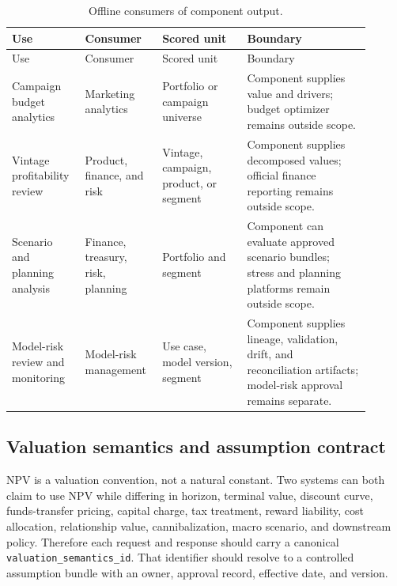 \documentclass[11pt]{article}
\newcommand{\1}{\mathbf{1}}
\newcommand{\code}[1]{\nolinkurl{#1}}
\begin{document}
\begin{longtable}{L{0.18\linewidth}L{0.18\linewidth}L{0.22\linewidth}L{0.32\linewidth}}
\caption{Offline consumers of component output.}
\label{tab:offline-contract}\\
\toprule
Use & Consumer & Scored unit & Boundary \\
\midrule
\endfirsthead
\toprule
Use & Consumer & Scored unit & Boundary \\
\midrule
\endhead
Campaign budget analytics
  & Marketing analytics
  & Portfolio or campaign universe
  & Component supplies value and drivers; budget optimizer remains outside
    scope. \\
Vintage profitability review
  & Product, finance, and risk
  & Vintage, campaign, product, or segment
  & Component supplies decomposed values; official finance reporting remains
    outside scope. \\
Scenario and planning analysis
  & Finance, treasury, risk, planning
  & Portfolio and segment
  & Component can evaluate approved scenario bundles; stress and planning
    platforms remain outside scope. \\
Model-risk review and monitoring
  & Model-risk management
  & Use case, model version, segment
  & Component supplies lineage, validation, drift, and reconciliation artifacts;
    model-risk approval remains separate. \\
\bottomrule
\end{longtable}

\subsection{Valuation semantics and assumption contract}
\label{subsec:valuation-semantics}

NPV is a valuation convention, not a natural constant. Two systems can both
claim to use NPV while differing in horizon, terminal value, discount curve,
funds-transfer pricing, capital charge, tax treatment, reward liability, cost
allocation, relationship value, cannibalization, macro scenario, and downstream
policy. Therefore each request and response should carry a canonical
\code{valuation_semantics_id}. That identifier should resolve to a controlled
assumption bundle with an owner, approval record, effective date, and version.
\end{document}

